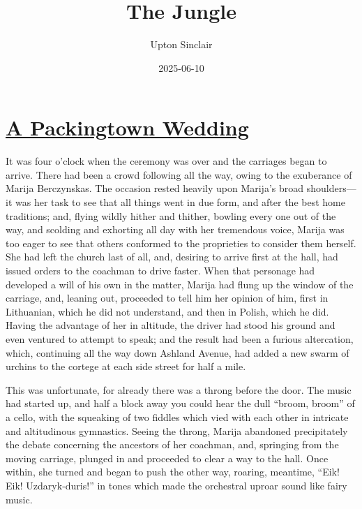 \documentclass[
]{book}
\title{The Jungle}
\author{Upton Sinclair}
\date{2025-06-10}
\theoremstyle{definition}
\theoremstyle{definition}
\theoremstyle{definition}
\theoremstyle{definition}
\theoremstyle{remark}
\begin{document}
\maketitle

{
\setcounter{tocdepth}{1}
\tableofcontents
}
\chapter{\texorpdfstring{\href{https://www.marxists.org/history/usa/pubs/appeal-to-reason/050225-appealtoreason-w482-thejungle.pdf}{A Packingtown Wedding}}{A Packingtown Wedding}}\label{a-packingtown-wedding}

It was four o'clock when the ceremony was over and the carriages began to arrive. There had been a crowd following all the way, owing to the exuberance of Marija Berczynskas. The occasion rested heavily upon Marija's broad shoulders---it was her task to see that all things went in due form, and after the best home traditions; and, flying wildly hither and thither, bowling every one out of the way, and scolding and exhorting all day with her tremendous voice, Marija was too eager to see that others conformed to the proprieties to consider them herself. She had left the church last of all, and, desiring to arrive first at the hall, had issued orders to the coachman to drive faster. When that personage had developed a will of his own in the matter, Marija had flung up the window of the carriage, and, leaning out, proceeded to tell him her opinion of him, first in Lithuanian, which he did not understand, and then in Polish, which he did. Having the advantage of her in altitude, the driver had stood his ground and even ventured to attempt to speak; and the result had been a furious altercation, which, continuing all the way down Ashland Avenue, had added a new swarm of urchins to the cortege at each side street for half a mile.

This was unfortunate, for already there was a throng before the door. The music had started up, and half a block away you could hear the dull ``broom, broom'' of a cello, with the squeaking of two fiddles which vied with each other in intricate and altitudinous gymnastics. Seeing the throng, Marija abandoned precipitately the debate concerning the ancestors of her coachman, and, springing from the moving carriage, plunged in and proceeded to clear a way to the hall. Once within, she turned and began to push the other way, roaring, meantime, ``Eik! Eik! Uzdaryk-duris!'' in tones which made the orchestral uproar sound like fairy music.
\end{document}
